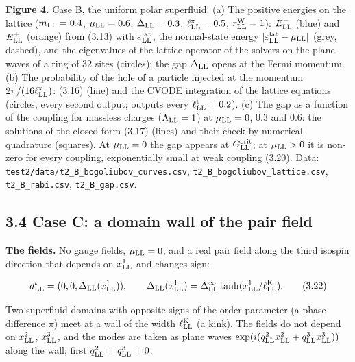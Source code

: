 \documentclass[
  10pt,
]{article}
\begin{document}
\textbf{Figure 4.} Case B, the uniform polar superfluid. (a) The
positive energies on the lattice (\(m_{\rm LL}=0.4\),
\(\mu_{\rm LL}=0.6\), \(\Delta_{\rm LL}=0.3\),
\(\ell^{\rm x}_{\rm LL}=0.5\), \(r^{\rm W}_{\rm LL}=1\)):
\(E^-_{\rm LL}\) (blue) and \(E^+_{\rm LL}\) (orange) from (3.13) with
\(\varepsilon^{\rm lat}_{\rm LL}\), the normal-state energy
\(\lvert\varepsilon^{\rm lat}_{\rm LL}-\mu_{\rm LL}\rvert\) (grey,
dashed), and the eigenvalues of the lattice operator of the solvers on
the plane waves of a ring of 32 sites (circles); the gap
\(\Delta_{\rm LL}\) opens at the Fermi momentum. (b) The probability of
the hole of a particle injected at the momentum
\(2\pi/(16\ell^{\rm x}_{\rm LL})\): (3.16) (line) and the CVODE
integration of the lattice equations (circles, every second output;
outputs every \(\ell^{\rm t}_{\rm LL}=0.2\)). (c) The gap as a function
of the coupling for massless charges (\(\Lambda_{\rm LL}=1\)) at
\(\mu_{\rm LL}=0\), \(0.3\) and \(0.6\): the solutions of the closed
form (3.17) (lines) and their check by numerical quadrature (squares).
At \(\mu_{\rm LL}=0\) the gap appears at \(G^{\rm crit}_{\rm LL}\); at
\(\mu_{\rm LL}>0\) it is non-zero for every coupling, exponentially
small at weak coupling (3.20). Data:
\texttt{test2/data/t2\_B\_bogoliubov\_curves.csv},
\texttt{t2\_B\_bogoliubov\_lattice.csv}, \texttt{t2\_B\_rabi.csv},
\texttt{t2\_B\_gap.csv}.

\hypertarget{case-c-a-domain-wall-of-the-pair-field}{%
\subsection{3.4 Case C: a domain wall of the pair
field}\label{case-c-a-domain-wall-of-the-pair-field}}

\textbf{The fields.} No gauge fields, \(\mu_{\rm LL}=0\), and a real
pair field along the third isospin direction that depends on
\(x^1_{\rm LL}\) and changes sign:

\[d^\iota_{\rm LL}=(0,0,\Delta_{\rm LL}(x^1_{\rm LL})),\qquad\Delta_{\rm LL}(x^1_{\rm LL})=\Delta^\infty_{\rm LL}\tanh(x^1_{\rm LL}/\ell^{\rm K}_{\rm LL}).\tag{3.22}\]

Two superfluid domains with opposite signs of the order parameter (a
phase difference \(\pi\)) meet at a wall of the width
\(\ell^{\rm K}_{\rm LL}\) (a kink). The fields do not depend on
\(x^2_{\rm LL}\), \(x^3_{\rm LL}\), and the modes are taken as plane
waves \(\exp(i(q^2_{\rm LL}x^2_{\rm LL}+q^3_{\rm LL}x^3_{\rm LL}))\)
along the wall; first \(q^2_{\rm LL}=q^3_{\rm LL}=0\).
\end{document}

